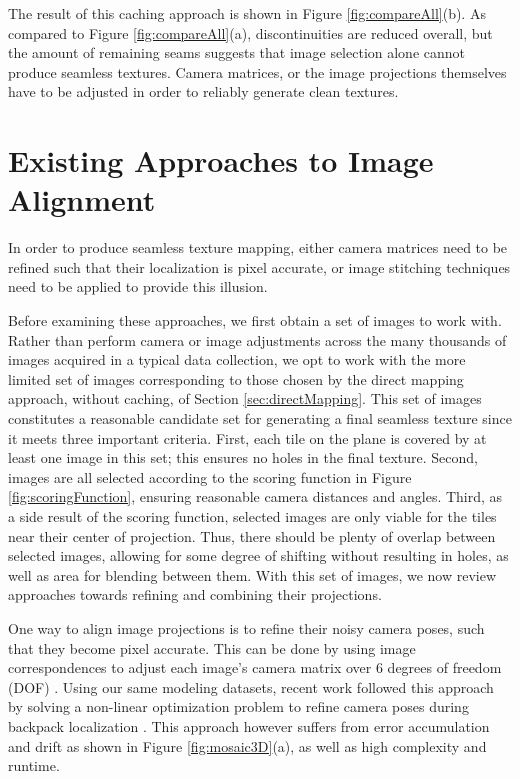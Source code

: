 \documentclass[10pt,twocolumn,letterpaper]{article}
\begin{document}
The result of this caching approach is shown in Figure
\ref{fig:compareAll}(b). As compared to Figure
\ref{fig:compareAll}(a), discontinuities are reduced overall, but the
amount of remaining seams suggests that image selection alone cannot
produce seamless textures. Camera matrices, or the image projections
themselves have to be adjusted in order to reliably generate clean
textures.

\section{Existing Approaches to Image Alignment}
\label{sec:existingApproaches}
In order to produce seamless texture mapping, either camera matrices
need to be refined such that their localization is pixel accurate, or
image stitching techniques need to be applied to provide this
illusion.

Before examining these approaches, we first obtain a set of images to
work with.  Rather than perform camera or image adjustments across the
many thousands of images acquired in a typical data collection, we opt
to work with the more limited set of images corresponding to those
chosen by the direct mapping approach, without caching, of Section
\ref{sec:directMapping}. This set of images constitutes a reasonable
candidate set for generating a final seamless texture since it meets
three important criteria. First, each tile on the plane is covered by
at least one image in this set; this ensures no holes in the final
texture. Second, images are all selected according to the scoring
function in Figure \ref{fig:scoringFunction}, ensuring reasonable
camera distances and angles. Third, as a side result of the scoring
function, selected images are only viable for the tiles near their
center of projection. Thus, there should be plenty of overlap between
selected images, allowing for some degree of shifting without
resulting in holes, as well as area for blending between them. With
this set of images, we now review approaches towards refining and
combining their projections.

One way to align image projections is to refine their noisy camera
poses, such that they become pixel accurate. This can be done by using
image correspondences to adjust each image's camera matrix over 6
degrees of freedom (DOF) \cite{coorg1997matching,
  liu2010indoor, shum2000systems, szeliski1997creating}. Using our same modeling datasets, recent work
followed this approach by solving a non-linear optimization problem to
refine camera poses during backpack localization \cite{liu2010indoor,
  chen2010indoor}. This approach however suffers from error
accumulation and drift as shown in Figure \ref{fig:mosaic3D}(a), as
well as high complexity and runtime.
\end{document}
